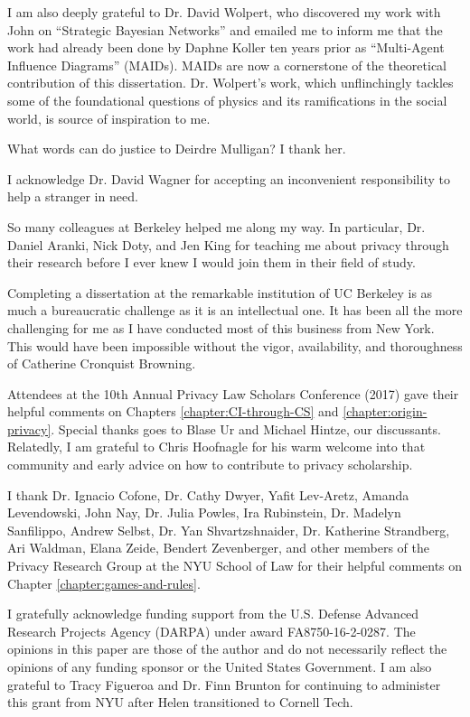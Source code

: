 \documentclass[../thesis.tex]{subfiles}
\begin{document}
 I am also deeply grateful to Dr. David Wolpert, who discovered
 my work with John on ``Strategic Bayesian Networks''
 and emailed me to inform me that the work had already
 been done by Daphne Koller ten years prior as
 ``Multi-Agent Influence Diagrams'' (MAIDs).
  MAIDs are now a cornerstone of the theoretical contribution
 of this dissertation.
 Dr. Wolpert's work, which unflinchingly tackles some
 of the foundational questions of physics and its ramifications
 in the social world, is source of inspiration to me.
 
 What words can do justice to Deirdre Mulligan?
 I thank her.

 I acknowledge Dr. David Wagner for accepting an
 inconvenient responsibility to help a stranger in need.

 So many colleagues at Berkeley helped me along my way.
 In particular, Dr. Daniel Aranki, Nick Doty, and Jen King
 for teaching me about privacy through their research
 before I ever knew I would join them in their field
 of study.

 Completing a dissertation at the remarkable institution
 of UC Berkeley is as much a bureaucratic challenge as it
 is an intellectual one.
 It has been all the more challenging for me as I
 have conducted most of this business from New York.
 This would have been impossible without the vigor,
 availability, and thoroughness of Catherine
 Cronquist Browning.
 
 Attendees at the 10th Annual Privacy Law Scholars Conference
 (2017) gave their helpful comments on
 Chapters \ref{chapter:CI-through-CS} and
 \ref{chapter:origin-privacy}.
 Special thanks goes to Blase Ur and Michael Hintze,
 our discussants.
 Relatedly, I am grateful to Chris Hoofnagle for his warm
 welcome into that community and early advice
 on how to contribute to privacy scholarship.

 I thank Dr. Ignacio Cofone, Dr. Cathy Dwyer, Yafit Lev-Aretz,
 Amanda Levendowski, John Nay, Dr. Julia Powles,
 Ira Rubinstein, Dr. Madelyn Sanfilippo, Andrew Selbst,
 Dr. Yan Shvartzshnaider,
 Dr. Katherine Strandberg, Ari Waldman, Elana Zeide,
 Bendert Zevenberger,  
 and other members of the Privacy Research Group at
 the NYU School of Law for their helpful comments
 on Chapter \ref{chapter:games-and-rules}.
 
 I gratefully acknowledge funding support 
 from the U.S. Defense Advanced Research Projects Agency (DARPA)
 under award FA8750-16-2-0287.
 The opinions in this paper are those of the author and do not
 necessarily reflect the opinions of any funding sponsor
 or the United States Government.
 I am also grateful to Tracy Figueroa and Dr. Finn Brunton
 for continuing to administer this grant from NYU after
 Helen transitioned to Cornell Tech.
 
\end{document}
